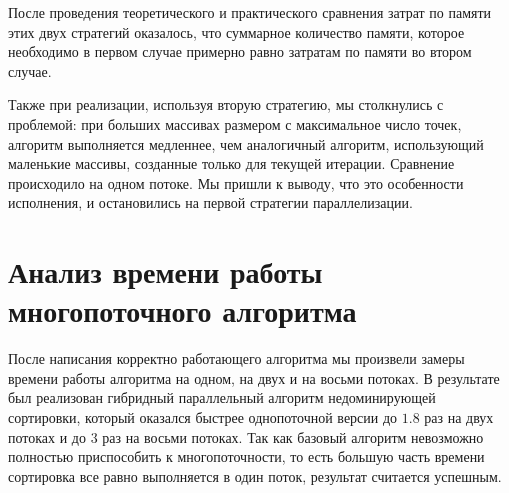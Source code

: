 После проведения теоретического и практического сравнения затрат по памяти этих двух стратегий оказалось, что суммарное количество памяти, которое необходимо в первом случае примерно равно затратам по памяти во втором случае. 

Также при реализации, используя вторую стратегию, мы столкнулись с проблемой: при больших массивах размером с максимальное число точек, алгоритм выполняется медленнее, чем аналогичный алгоритм, использующий маленькие массивы, созданные только для текущей итерации. Сравнение происходило на одном потоке. Мы пришли к выводу, что это особенности исполнения, и остановились на первой стратегии параллелизации. 

\section{Анализ времени работы многопоточного алгоритма}

После написания корректно работающего алгоритма мы произвели замеры времени работы алгоритма на одном, на двух и на восьми потоках. В результате был реализован гибридный параллельный алгоритм недоминирующей сортировки, который оказался быстрее однопоточной версии до $1.8$ раз на двух потоках и до $3$ раз на восьми потоках. Так как базовый алгоритм невозможно полностью приспособить к многопоточности, то есть большую часть времени сортировка все равно выполняется в один поток, результат считается успешным.

